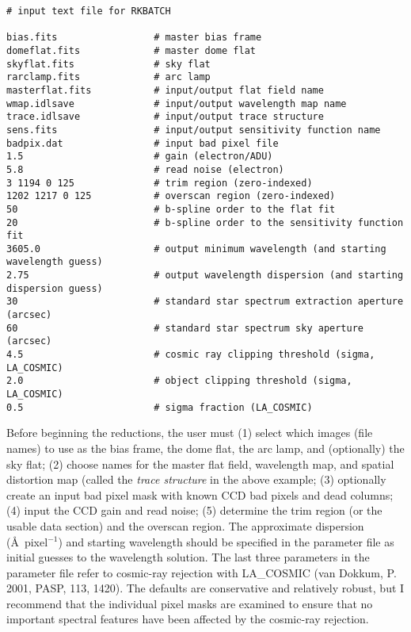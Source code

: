 \documentclass[preprint,11pt]{aastex}
\begin{document}
\begin{center}
\begin{verbatim}
# input text file for RKBATCH

bias.fits                 # master bias frame
domeflat.fits             # master dome flat
skyflat.fits              # sky flat
rarclamp.fits             # arc lamp
masterflat.fits           # input/output flat field name
wmap.idlsave              # input/output wavelength map name
trace.idlsave             # input/output trace structure
sens.fits                 # input/output sensitivity function name
badpix.dat                # input bad pixel file
1.5                       # gain (electron/ADU)
5.8                       # read noise (electron)
3 1194 0 125              # trim region (zero-indexed)
1202 1217 0 125           # overscan region (zero-indexed)
50                        # b-spline order to the flat fit
20                        # b-spline order to the sensitivity function fit
3605.0                    # output minimum wavelength (and starting wavelength guess)
2.75                      # output wavelength dispersion (and starting dispersion guess)
30                        # standard star spectrum extraction aperture (arcsec)
60                        # standard star spectrum sky aperture (arcsec)
4.5                       # cosmic ray clipping threshold (sigma, LA_COSMIC)
2.0                       # object clipping threshold (sigma, LA_COSMIC)
0.5                       # sigma fraction (LA_COSMIC)
\end{verbatim}
\end{center}

\noindent Before beginning the reductions, the user must (1) select
which images (file names) to use as the bias frame, the dome flat, the
arc lamp, and (optionally) the sky flat; (2) choose names for the
master flat field, wavelength map, and spatial distortion map (called
the {\em trace structure} in the above example; (3) optionally create
an input bad pixel mask with known CCD bad pixels and dead columns;
(4) input the CCD gain and read noise; (5) determine the trim region
(or the usable data section) and the overscan region.  The approximate
dispersion (\AA~pixel$^{-1}$) and starting wavelength should be
specified in the parameter file as initial guesses to the wavelength
solution.  The last three parameters in the parameter file refer to
cosmic-ray rejection with LA\_COSMIC (van Dokkum, P. 2001, PASP, 113,
1420).  The defaults are conservative and relatively robust, but I
recommend that the individual pixel masks are examined to ensure that
no important spectral features have been affected by the cosmic-ray
rejection.
\end{document}
